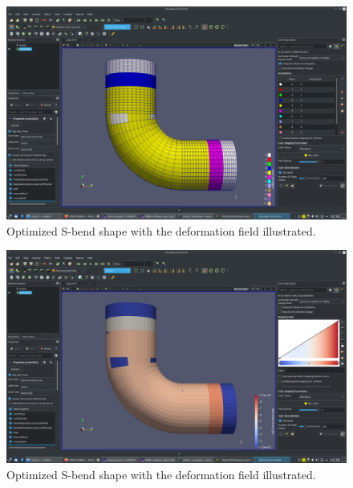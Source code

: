 \documentclass[onsided]{book}
\numberwithin{equation}{section}
\begin{document}
\begin{enumerate}
    \begin{figure}[H]
        \centering
        \includegraphics[height=0.44\textheight]{airDuct_vtkBlockColors_partial_Surface_with_Edges}
        \caption{Optimized S-bend shape with the deformation field illustrated.}
    \end{figure}

    \begin{figure}[H]
        \centering
        \includegraphics[height=0.44\textheight]{airDuct_vtkCompositeIndex_Surface}
        \caption{Optimized S-bend shape with the deformation field illustrated.}
    \end{figure}
    

\end{enumerate}
\end{document}
